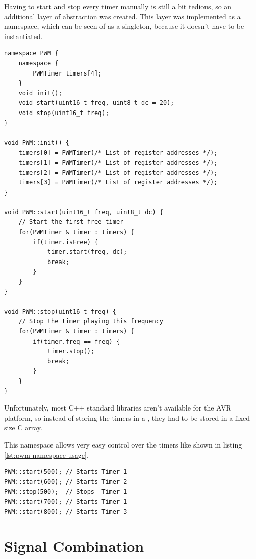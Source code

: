 Having to start and stop every timer manually is still a bit tedious, so an additional layer of abstraction was created. This layer was implemented as a namespace, which can be seen of as a singleton, because it doesn't have to be instantiated.

\begin{lstlisting}[caption=PWM namespace, label=lst:pwm-namespace]
namespace PWM {
	namespace {
		PWMTimer timers[4];
	}
	void init();
	void start(uint16_t freq, uint8_t dc = 20);
	void stop(uint16_t freq);
}

void PWM::init() {
    timers[0] = PWMTimer(/* List of register addresses */);
	timers[1] = PWMTimer(/* List of register addresses */);
	timers[2] = PWMTimer(/* List of register addresses */);
	timers[3] = PWMTimer(/* List of register addresses */);
}

void PWM::start(uint16_t freq, uint8_t dc) {
    // Start the first free timer
    for(PWMTimer & timer : timers) {
        if(timer.isFree) {
            timer.start(freq, dc);
            break;
        }
    }
}

void PWM::stop(uint16_t freq) {
    // Stop the timer playing this frequency
    for(PWMTimer & timer : timers) {
        if(timer.freq == freq) {
            timer.stop();
            break;
        }
    }
}
\end{lstlisting}

Unfortunately, most C++ standard libraries aren't available for the AVR platform, so instead of storing the timers in a , they had to be stored in a fixed-size C array.

This namespace allows very easy control over the timers like shown in listing \ref{lst:pwm-namespace-usage}.

\begin{lstlisting}[caption=PWM namespace usage, label=lst:pwm-namespace-usage]
PWM::start(500); // Starts Timer 1
PWM::start(600); // Starts Timer 2
PWM::stop(500);  // Stops  Timer 1
PWM::start(700); // Starts Timer 1
PWM::start(800); // Starts Timer 3
\end{lstlisting}

\section{Signal Combination}
\label{sec:signal-combination}